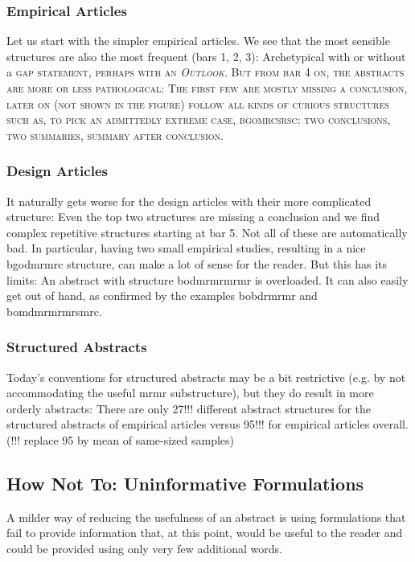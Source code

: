 \documentclass[10pt,journal,compsoc]{IEEEtran}
\newcommand{\Cb}[1]{\bgroup\scshape #1\egroup}  %
\begin{document}
\subsubsection{Empirical Articles}

Let us start with the simpler empirical articles.
We see that the most sensible structures are also the most frequent (bars 1, 2, 3):
Archetypical with or without a \Cb{gap} statement, perhaps with an \emph{Outlook}.
But from bar 4 on, the abstracts are more or less pathological:
The first few are mostly missing a conclusion, later on (not shown in the figure)
follow all kinds of curious structures such as, to pick an admittedly extreme case,
bgomrcsrsc: two conclusions, two summaries, summary after conclusion.

\subsubsection{Design Articles}

It naturally gets worse for the design articles with their more complicated structure:
Even the top two structures are missing a conclusion
and we find complex repetitive structures starting at bar 5.
Not all of these are automatically bad.
In particular, having two small empirical studies, resulting in a nice bgodmrmrc structure,
can make a lot of sense for the reader.
But this has its limits: An abstract with structure bodmrmrmrmr is overloaded.
It can also easily get out of hand, as confirmed by the examples bobdrmrmr and bomdmrmrmrsmrc.

\subsubsection{Structured Abstracts}

Today's conventions for structured abstracts may be a bit restrictive
(e.g. by not accommodating the useful mrmr substructure),
but they do result in more orderly abstracts:
There are only 27!!! different abstract structures for the structured abstracts of empirical articles
versus 95!!! for empirical articles overall.
(!!! replace 95 by mean of same-sized samples)


\subsection{How Not To: Uninformative Formulations}

A milder way of reducing the usefulness of an abstract is using formulations that
fail to provide information that, at this point, would be useful to the reader and
could be provided using only very few additional words.
\end{document}

